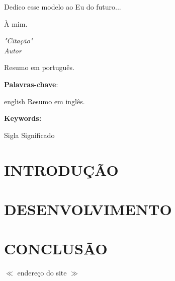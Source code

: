 \documentclass[12pt,a4paper,oneside]{abntex2}
\begin{document}
	\begin{dedicatoria} %
		\vspace*{\fill}
		\begin{flushright}
			Dedico esse modelo ao Eu do futuro...
		\end{flushright}
	\end{dedicatoria}

	\begin{agradecimentos}  %
		À mim.
	\end{agradecimentos}

	\begin{epigrafe} %
		\vspace*{\fill}
		\begin{flushright} %
			\textit{"Citação"\\Autor}
		\end{flushright} 
	\end{epigrafe}

	\begin{resumo}
		Resumo em português.
		
		\noindent \textbf{Palavras-chave}: 
	\end{resumo}
	
	\begin{resumo}[\normalsize ABSTRACT]
		
		\begin{otherlanguage*}{english}
			Resumo em inglês.
			
			\noindent \textbf{Keywords: }
		\end{otherlanguage*}

	\end{resumo}

	\listoffigures*
	\newpage
	\listoftables*
	\begin{siglas} %
		\item[Sigla] Significado
	\end{siglas}
	\tableofcontents* \thispagestyle{empty} %
	\mainmatter %
	
	\chapter{INTRODUÇÃO}
	\chapter{DESENVOLVIMENTO}
	\chapter{CONCLUSÃO}
	
	\begin{thebibliography}{1}
		  $\ll$ endereço do site $\gg$
	\end{thebibliography}
\end{document}
